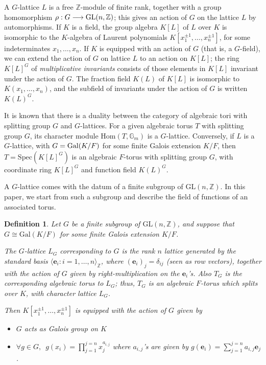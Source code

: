 \documentclass[12pt]{article}
\theoremstyle{plain}
\newtheorem{definition}[theorem]{Definition}
\newcommand{\Z}{\ensuremath{\mathbb{Z}}}
\begin{document}
A $G$-lattice $L$ is a free $\Z$-module of finite rank, together with
a group homomorphism $\rho: G \longrightarrow {\rm GL}(n,\Z)$; this
gives an action of $G$ on the lattice $L$ by automorphisms.  If $K$ is
a field, the group algebra $K[L]$ of $L$ over $K$ is isomorphic to the
$K$-algebra of Laurent polynomials $K[x_1^{\pm 1},\dots,x_n^{\pm 1}]$,
for some indeterminates $x_1,\dots,x_n$.  If $K$ is equipped with an
action of $G$ (that is, a $G$-field), we can extend the action of $G$
on lattice $L$ to an action on $K[L]$; the ring $K[L]^G$ of {\em
  multiplicative invariants} consists of those elements in $K[L]$
invariant under the action of $G$. The fraction field $K(L)$ of $K[L]$
is isomorphic to $K(x_1,\dots,x_n)$, and the subfield of
invariants under the action of $G$ is written $K(L)^G$.

It is known that there is a duality between the category of algebraic
tori with splitting group $G$ and $G$-lattices. For a given algebraic
torus $T$ with splitting group $G$, its character module
$\mathrm{Hom}(T,\mathbb{G}_m)$ is a $G$-lattice. Conversely, if $L$ is
a $G$-lattice, with $G={\rm Gal}(K/F)$ for some finite Galois
extension $K/F$, then $T=\mathrm{Spec}(K[L]^G)$ is an algebraic
$F$-torus with splitting group $G$, with coordinate ring $K[L]^G$ and
function field $K(L)^G$.

A $G$-lattice comes with the datum of a finite subgroup of
$\mathrm{GL}(n,\Z)$. In this paper, we start from such a subgroup and
describe the field of functions of an associated torus.


\begin{definition}\label{Assumption}
  Let $G$ be a finite subgroup of $\mathrm{GL}(n,\Z)$, and suppose
  that $G \cong \mathrm{Gal}(K/F)$ for some finite Galois extension
  $K/F$.

  The $G$-lattice $L_G$ corresponding to $G$ is the rank $n$ lattice
  generated by the standard basis $ \langle \textbf{e}_i : i = 1,
  \ldots, n \rangle_\Z$, where $(\textbf{e}_i)_j = \delta_{ij}$ (seen
  as row vectors), together with the action of $G$ given by
  right-multiplication on the $\textbf{e}_i$'s.  Also $T_G$ is the
  corresponding algebraic torus to $L_G$; thus, $T_G$ is an algebraic
  $F$-torus which splits over $K$, with character lattice $L_G$.

  Then $K[x_1^{\pm 1}, \ldots , x_n^{\pm 1}]$ is equipped with the
  action of $G$ given by
  \begin{itemize}
  \item $G$ acts as Galois group on $K$
  \item $\forall g \in G, \,\,\, g(x_i) = \prod_{j=1}^{j=n}
    x_j^{a_{i,j}}$ where $a_{i,j}$'s are given by $g(\textbf{e}_i) =
    \sum_{j=1}^{j=n} a_{i,j}\textbf{e}_j$.
  \end{itemize}
\end{definition}
\end{document}
